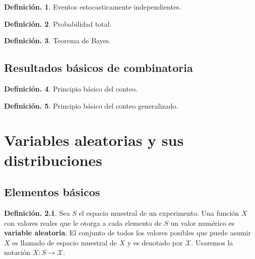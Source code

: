 \documentclass[]{book}
\theoremstyle{definition}
\newtheorem{definition}{Definición.}[chapter]
\theoremstyle{definition}
\theoremstyle{definition}
\theoremstyle{remark}
\begin{document}
\begin{definition}
\protect\hypertarget{def:unnamed-chunk-95}{}{\label{def:unnamed-chunk-95} }Eventos estocasticamente independientes.
\end{definition}

\begin{definition}
\protect\hypertarget{def:unnamed-chunk-96}{}{\label{def:unnamed-chunk-96} }Probabilidad total.
\end{definition}

\begin{definition}
\protect\hypertarget{def:unnamed-chunk-97}{}{\label{def:unnamed-chunk-97} }Teorema de Bayes.
\end{definition}

\hypertarget{resultados-buxe1sicos-de-combinatoria}{%
\section{Resultados básicos de combinatoria}\label{resultados-buxe1sicos-de-combinatoria}}

\begin{definition}
\protect\hypertarget{def:unnamed-chunk-98}{}{\label{def:unnamed-chunk-98} }Principio básico del conteo.
\end{definition}

\begin{definition}
\protect\hypertarget{def:unnamed-chunk-99}{}{\label{def:unnamed-chunk-99} }Principio básico del conteo generalizado.
\end{definition}

\hypertarget{var}{%
\chapter{Variables aleatorias y sus distribuciones}\label{var}}

\hypertarget{elementos-buxe1sicos}{%
\section{Elementos básicos}\label{elementos-buxe1sicos}}

\begin{definition}
\protect\hypertarget{def:unnamed-chunk-100}{}{\label{def:unnamed-chunk-100} }Sea \(S\) el espacio muestral de un experimento. Una función \(X\) con valores reales que le otorga a cada elemento de \(S\) un valor numérico es \textbf{variable aleatoria}. El conjunto de todos los valores posibles que puede asumir \(X\) es llamado de espacio muestral de \(X\) y es denotado por \(\mathcal{X}\). Usaremos la notación \(X:S\to \mathcal{X}\).
\end{definition}
\end{document}
